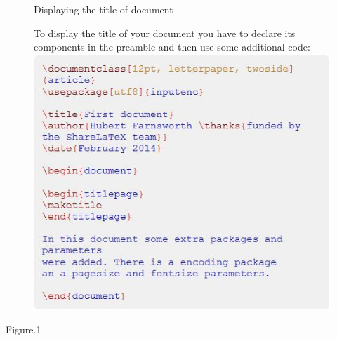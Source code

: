 \documentclass[onecolumn,journal] {IEEEtran}
\begin{document}
\begin{figure}
\begin{Large}
Displaying the title of  document 
\end{Large}
\newline

To display the title of your document you have to declare its components in the preamble and then use some additional code: \\

\center
  \includegraphics[width=8 cm]{code3.jpg}



\end{figure}
\begin{center}
Figure.1 %
\end{center}
  
\end{document}
